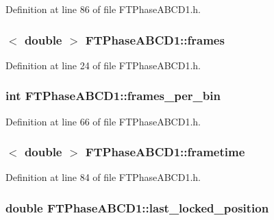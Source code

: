 Definition at line 86 of file FTPhaseABCD1.h.

\hypertarget{classFTPhaseABCD1_a1891f6e4f2a92991da6a1a3a0fc99fd4}{
\subsubsection[{frames}]{$<$ double $>$ {\bf FTPhaseABCD1::frames}}}
\label{classFTPhaseABCD1_a1891f6e4f2a92991da6a1a3a0fc99fd4}


Definition at line 24 of file FTPhaseABCD1.h.

\hypertarget{classFTPhaseABCD1_a5f8098aa51b878962500a3bae1eac959}{
\subsubsection[{frames\_\-per\_\-bin}]{\setlength{\rightskip}{0pt plus 5cm}int {\bf FTPhaseABCD1::frames\_\-per\_\-bin}}}
\label{classFTPhaseABCD1_a5f8098aa51b878962500a3bae1eac959}


Definition at line 66 of file FTPhaseABCD1.h.

\hypertarget{classFTPhaseABCD1_a7dacaa305568f8fc4d0a59f4df383142}{
\subsubsection[{frametime}]{$<$ double $>$ {\bf FTPhaseABCD1::frametime}}}
\label{classFTPhaseABCD1_a7dacaa305568f8fc4d0a59f4df383142}


Definition at line 84 of file FTPhaseABCD1.h.

\hypertarget{classFTPhaseABCD1_a7dcc8c733abc1e883df9f2e781b2fc93}{
\subsubsection[{last\_\-locked\_\-position}]{\setlength{\rightskip}{0pt plus 5cm}double {\bf FTPhaseABCD1::last\_\-locked\_\-position}}}
\label{classFTPhaseABCD1_a7dcc8c733abc1e883df9f2e781b2fc93}


